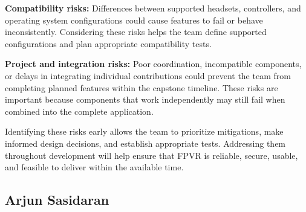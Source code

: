 \documentclass{article}
\begin{document}
\begin{enumerate}
    \textbf{Compatibility risks:}
    Differences between supported headsets, controllers, and
    operating system configurations could cause features to
    fail or behave inconsistently. Considering these risks
    helps the team define supported configurations and plan
    appropriate compatibility tests.

    \textbf{Project and integration risks:}
    Poor coordination, incompatible components, or delays in
    integrating individual contributions could prevent the
    team from completing planned features within the capstone
    timeline. These risks are important because components
    that work independently may still fail when combined
    into the complete application.

    Identifying these risks early allows the team to prioritize
    mitigations, make informed design decisions, and establish
    appropriate tests. Addressing them throughout development
    will help ensure that FPVR is reliable, secure, usable,
    and feasible to deliver within the available time.

\end{enumerate}

\subsection*{Arjun Sasidaran}
\end{document}

